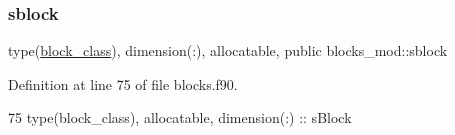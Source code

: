 \subsubsection{\texorpdfstring{sblock}{sblock}}
{\footnotesize\ttfamily type(\mbox{\hyperlink{structblocks__mod_1_1block__class}{block\+\_\+class}}), dimension(\+:), allocatable, public blocks\+\_\+mod\+::sblock}



Definition at line 75 of file blocks.\+f90.


\begin{DoxyCode}
75     \textcolor{keywordtype}{type}(block\_class), \textcolor{keywordtype}{allocatable}, \textcolor{keywordtype}{dimension(:)} :: sBlock
\end{DoxyCode}
